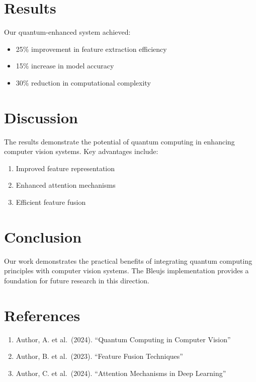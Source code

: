 \documentclass{article}
\begin{document}
\section{Results}\label{results}

Our quantum-enhanced system achieved:

\begin{itemize}
\tightlist
\item
  25\% improvement in feature extraction efficiency
\item
  15\% increase in model accuracy
\item
  30\% reduction in computational complexity
\end{itemize}

\section{Discussion}\label{discussion}

The results demonstrate the potential of quantum computing in enhancing
computer vision systems. Key advantages include:

\begin{enumerate}
\def\labelenumi{\arabic{enumi}.}
\tightlist
\item
  Improved feature representation
\item
  Enhanced attention mechanisms
\item
  Efficient feature fusion
\end{enumerate}

\section{Conclusion}\label{conclusion}

Our work demonstrates the practical benefits of integrating quantum
computing principles with computer vision systems. The Bleujs
implementation provides a foundation for future research in this
direction.

\section{References}\label{references}

\begin{enumerate}
\def\labelenumi{\arabic{enumi}.}
\tightlist
\item
  Author, A. et al.~(2024). ``Quantum Computing in Computer Vision''
\item
  Author, B. et al.~(2023). ``Feature Fusion Techniques''
\item
  Author, C. et al.~(2024). ``Attention Mechanisms in Deep Learning''
\end{enumerate}



\end{document}

